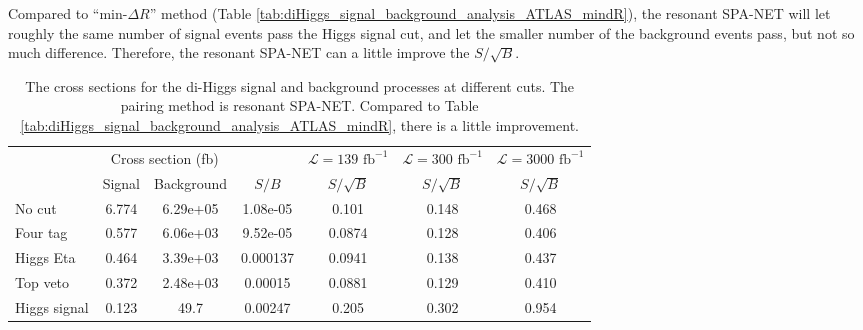 \documentclass[12pt]{article}
\begin{document}
		Compared to ``$\text{min-}\Delta R$'' method (Table \ref{tab:diHiggs_signal_background_analysis_ATLAS_mindR}), the resonant SPA-NET will let roughly the same number of signal events pass the Higgs signal cut, and let the smaller number of the background events pass, but not so much difference. Therefore, the resonant SPA-NET can a little improve the $S/\sqrt{B}$.

		\begin{table}[htpb]
			\centering
			\caption{The cross sections for the di-Higgs signal and background processes at different cuts. The pairing method is resonant SPA-NET. Compared to Table \ref{tab:diHiggs_signal_background_analysis_ATLAS_mindR}, there is a little improvement.}
			\label{tab:diHiggs_signal_background_analysis_ATLAS_resonant_SPANET}
			\begin{tabular}{l|cc|c|c|c|c}
							 & \multicolumn{2}{c|}{Cross section (fb)} &          & $\mathcal{L} = 139 \text{ fb}^{-1}$ & $\mathcal{L} = 300 \text{ fb}^{-1}$ & $\mathcal{L} = 3000 \text{ fb}^{-1}$ \\
							 & Signal           & Background           & $S / B$  & $S/\sqrt{B}$                        & $S/\sqrt{B}$                        & $S/\sqrt{B}$                         \\ \hline
				No cut       & 6.774 & 6.29e+05 & 1.08e-05 & 0.101  & 0.148 & 0.468 \\
				Four tag     & 0.577 & 6.06e+03 & 9.52e-05 & 0.0874 & 0.128 & 0.406 \\
				Higgs Eta    & 0.464 & 3.39e+03 & 0.000137 & 0.0941 & 0.138 & 0.437 \\
				Top veto     & 0.372 & 2.48e+03 & 0.00015  & 0.0881 & 0.129 & 0.410 \\
				Higgs signal & 0.123 & 49.7     & 0.00247  & 0.205  & 0.302 & 0.954	
			\end{tabular}
		\end{table}

\end{document}
